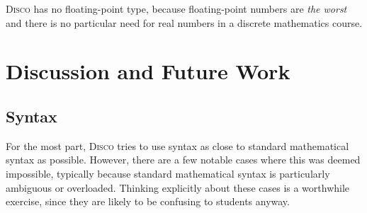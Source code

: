 \documentclass[submission,copyright,creativecommons]{eptcs}
\newcommand{\disco}{\textsc{Disco}\xspace}
\newcommand{\todo}[1]{\textcolor{red}{[TODO: #1]}}
\newcommand{\todo}[1]{}
\begin{document}
\disco has no floating-point type, because floating-point numbers are
\emph{the worst} \cite{goldberg1991every} and there is no particular
need for real numbers in a discrete mathematics course.


\section{Discussion and Future Work}
\label{sec:discussion}

\subsection{Syntax}
\label{sec:syntax}

For the most part, \disco tries to use syntax as close to standard
mathematical syntax as possible.  However, there are a few notable
cases where this was deemed impossible, typically because standard
mathematical syntax is particularly ambiguous or overloaded.  Thinking
explicitly about these cases is a worthwhile exercise, since they are
likely to be confusing to students anyway.
\end{document}

